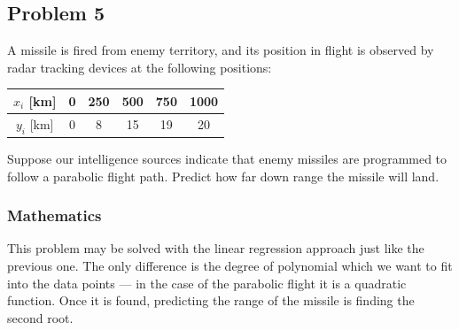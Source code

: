 \subsection{Problem 5}%
\label{sec:problem_5}
A missile is fired from enemy territory, and its position in flight is observed by radar
tracking devices at the following positions:
\begin{center}
  \begin{tabular}{|c|c|c|c|c|c|}
    \hline
    $x_i$ [km] & 0 & 250 & 500 & 750 & 1000 \\
    \hline
    $y_i$ [km] & 0 & 8 & 15 & 19 & 20 \\
    \hline
  \end{tabular}
\end{center}
Suppose our intelligence sources indicate that enemy missiles are programmed to follow a
parabolic flight path. Predict how far down range the missile will land.
\subsubsection*{Mathematics}
This problem may be solved with the linear regression approach just like the previous
one.
The only difference is the degree of polynomial which we want to fit into the data
points --- in the case of the parabolic flight it is a quadratic function.
Once it is found, predicting the range of the missile is finding the second root.
